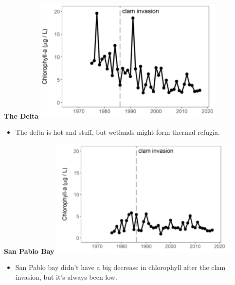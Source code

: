 \documentclass[]{article}\usepackage[]{graphicx}\usepackage[]{color}
\begin{document}
\vspace{1cm}

\begin{Row}
  \begin{Cell}{7}
    \begin{center}
      {\bf {\large The Delta}}
      \includegraphics[width=9.5cm,align=m]{figures/chlorophyll/chlorophyll_delta_tmp.png}
      \vspace{0.5cm}
      \begin{itemize}[leftmargin=2cm,rightmargin=0.5cm]
        \item The delta is hot and stuff, but wetlands might form thermal refugia.
      \end{itemize}
    \end{center}
  \end{Cell}
  \begin{Cell}{6}
    \begin{center}
      {\bf {\large San Pablo Bay}}
      \includegraphics[width=9.5cm,align=m]{figures/chlorophyll/chlorophyll_san_pablo_bay_tmp.png}
      \vspace{0.5cm}
      \begin{itemize}[leftmargin=2cm,rightmargin=0.5cm]
        \item San Pablo bay didn't have a big decrease in chlorophyll after the clam 
        invasion, but it's always been low.
      \end{itemize}
    \end{center}
  \end{Cell}
\end{Row}
\end{document}
